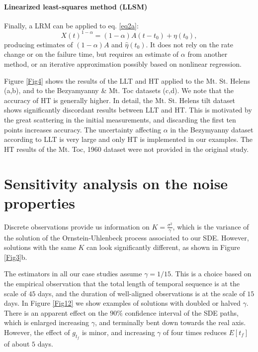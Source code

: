 \documentclass{article}
\begin{document}
\paragraph{Linearized least-squares method (LLSM)}
Finally, a LRM can be applied to eq. \ref{eq2a}:
$$X(t)^{1-\alpha}=(1-\alpha)A(t-t_0)+\eta(t_0),$$
producing estimates of $(1-\alpha)A$ and $\hat\eta(t_0)$. It does not rely on the rate change or on the failure time, but requires an estimate of $\alpha$ from another method, or an iterative approximation possibly based on nonlinear regression.

Figure \ref{Fig4} shows the results of the LLT and HT applied to the Mt. St. Helens (a,b), and to the Bezyamyanny \& Mt. Toc datasets (c,d). We note that the accuracy of HT is generally higher. In detail, the Mt. St. Helens tilt dataset shows significantly discordant results between LLT and HT. This is motivated by the great scattering in the initial measurements, and discarding the first ten points increases accuracy. The uncertainty affecting $\alpha$ in the Bezymyanny dataset according to LLT is very large and only HT is implemented in our examples. The HT results of the Mt. Toc, 1960 dataset were not provided in the original study.
\newpage
\section{Sensitivity analysis on the noise properties}\label{A-2}
Discrete observations provide us information on $K=\frac{\sigma^2}{\gamma}$, which is the variance of the solution of the Ornstein-Uhlenbeck process associated to our SDE. However, solutions with the same $K$ can look significantly different, as shown in Figure \ref{Fig3}b.

The estimators in all our case studies assume $\gamma=1/15$.  This is a choice based on the empirical observation that the total length of temporal sequence is at the scale of $45$ days, and the duration of well-aligned observations is at the scale of $15$ days. In Figure \ref{Fig12} we show examples of solutions with doubled or halved $\gamma$. There is an apparent effect on the $90\%$ confidence interval of the SDE paths, which is enlarged increasing $\gamma$, and terminally bent down towards the real axis. However, the effect of $g_{t_f}$ is minor, and increasing $\gamma$ of four times reduces $E[t_f]$ of about $5$ days.
\end{document}
